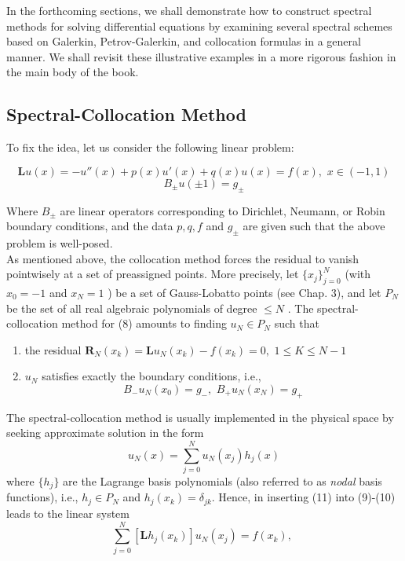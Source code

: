 In the forthcoming sections, we shall demonstrate how to construct spectral methods for solving differential equations by examining several spectral schemes based on Galerkin, Petrov-Galerkin, and collocation formulas in a general manner. We shall revisit these illustrative examples in a more rigorous fashion in the main body of the book.

\subsection{Spectral-Collocation Method}

To fix the idea, let us consider the following linear problem:

\[
	\mathbf{ L }u(x) = -u''(x) + p(x) u'(x) + q(x) u(x) = f(x), \hspace{4pt} x \in (-1,1)
\]
\begin{equation}
	B_{ \pm }u(\pm 1) = g_{ \pm }
\end{equation}

Where $ B_{ \pm } $ are linear operators corresponding to Dirichlet, Neumann, or Robin boundary conditions, and the data $ p,q,f $ and $ g_{ \pm } $ are given such that the above problem is well-posed. \\
\indent As mentioned above, the collocation method forces the residual to vanish pointwisely at a set of preassigned points. More precisely, let $ \{ x_{ j } \}_{ j=0 }^{ N } $ (with $ x_{ 0 }= -1 $ and $ x_{ N } = 1 $ ) be a set of Gauss-Lobatto points (see Chap. 3), and let $ P_{ N } $ be the set of all real algebraic polynomials of degree $ \leq N $ . The spectral-collocation method for (8) amounts to finding $ u_{ N } \in P_{ N } $ such that

\begin{enumerate}
	\item the residual $ \mathbf{ R }_{ N }(x_{ k }) = \mathbf{ L }u_{ N }(x_{ k }) - f(x_{ k }) = 0, \hspace{4pt} 1 \leq K \leq N-1 $ 
	\item $ u_{ N } $ satisfies exactly the boundary conditions, i.e.,
		\begin{equation}
			B_{ - }u_{ N }(x_{ 0 }) = g_{ - }, \hspace{4pt} B_{ + }u_{ N }\left( x_{ N } \right) = g_{ + }
		\end{equation}
\end{enumerate}

The spectral-collocation method is usually implemented in the physical space by seeking approximate solution in the form
\begin{equation}
	u_{ N }(x) = \sum_{ j=0 }^{ N } u_{ N }(x_{ j }) h_{ j }(x)	
\end{equation}
where $ \{ h_{ j } \} $ are the Lagrange basis polynomials (also referred to as \textit{nodal} basis functions), i.e., $ h_{ j } \in P_{ N } $ and $ h_{ j } (x_{ k }) = \delta_{ jk } $. Hence, in inserting (11) into (9)-(10) leads to the linear system
\[
	\sum_{ j=0 }^{ N } \left[ \mathbf{ L }h_{ j }(x_{ k }) \right] u_{ N }(x_{ j }) = f(x_{ k }), \hspace{4pt}
\]

		
